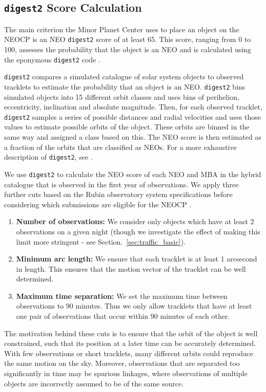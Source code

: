 \documentclass[twocolumn]{aastex631}
\newcommand{\dig}{\texttt{digest2}}
\begin{document}
\subsection{\dig{} Score Calculation}\label{sec:digest2_score}
The main criterion the Minor Planet Center uses to place an object on the NEOCP is an NEO \dig{} score of at least 65. This score, ranging from 0 to 100, assesses the probability that the object is an NEO and is calculated using the eponymous \dig{} code \citep{Keys+2019}.

\dig{} compares a simulated catalogue of solar system objects to observed tracklets to estimate the probability that an object is an NEO. \dig{} bins simulated objects into 15 different orbit classes and uses bins of perihelion, eccentricity, inclination and absolute magnitude. Then, for each observed tracklet, \dig{} samples a series of possible distances and radial velocities and uses those values to estimate possible orbits of the object. These orbits are binned in the same way and assigned a class based on this. The NEO score is then estimated as a fraction of the orbits that are classified as NEOs. For a more exhaustive description of \dig{}, see \citet{Keys+2019}.

We use \dig{} to calculate the NEO score of each NEO and MBA in the hybrid catalogue that is observed in the first year of observations. We apply three further cuts based on the Rubin observatory system specifications before considering which submissions are eligible for the NEOCP \citep{oss}.
\begin{enumerate}
    \item \textbf{Number of observations:} We consider only objects which have at least 2 observations on a given night (though we investigate the effect of making this limit more stringent - see Section.~\ref{sec:traffic_basic}).
    \item \textbf{Minimum arc length:} We ensure that each tracklet is at least 1 arcsecond in length. This ensures that the motion vector of the tracklet can be well determined.
    \item \textbf{Maximum time separation:} We set the maximum time between observations to 90 minutes. Thus we only allow tracklets that have at least one pair of observations that occur within 90 minutes of each other.
\end{enumerate}
The motivation behind these cuts is to ensure that the orbit of the object is well constrained, such that its position at a later time can be accurately determined. With few observations or short tracklets, many different orbits could reproduce the same motion on the sky. Moreover, observations that are separated too significantly in time may be spurious linkages, where observations of multiple objects are incorrectly assumed to be of the same source.
\end{document}

